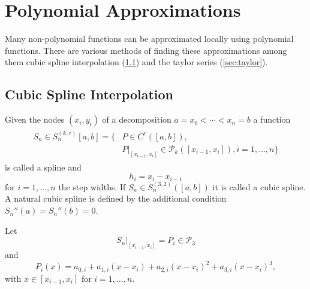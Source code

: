 \documentclass[a4paper, 11pt]{memoir}
\begin{document}
    \section{Polynomial Approximations}
    \label{sec:poly_approx}
    Many non-polynomial functions can be approximated locally using polynomial functions. There are various methods of
    finding these approximations among them cubic spline interpolation (\ref{sec:cubic_spline}) and the taylor series
    (\ref{sec:taylor}).

    \subsection{Cubic Spline Interpolation}
    \label{sec:cubic_spline}
    Given the nodes $(x_i, y_i)$ of a decomposition $a = x_0 < \cdots < x_n = b$ a function
    \begin{align}
        \begin{aligned}
            S_n \in S_n^{(k, r)}[a, b] = \{ &P \in C^r([a, b]),\\&P|_{[x_{i - 1}, x_i]} \in \mathcal{P}_k([x_{i - 1}, x_i]), i=1,\dots,n \}
        \end{aligned}
    \end{align}
    is called a spline and
    \begin{equation}
        h_i = x_i - x_{i-1}
    \end{equation}
    for $i=1,\dots,n$ the step widths. If $S_n \in S_n^{(3, 2)}([a, b])$ it is called a cubic spline. A natural cubic spline is defined by
    the additional condition $S_n''(a) = S_n''(b) = 0$.

    Let
    \begin{equation}
        S_n|_{[x_{i-1}, x_i]} = P_i \in \mathcal{P}_3
    \end{equation}
    and
    \begin{equation}
        P_i(x) = a_{0,i} + a_{1,i}(x - x_i) + a_{2,i}(x - x_i)^2 + a_{3,i}(x - x_i)^3,
    \end{equation}
    with $x\in[x_{i-1}, x_i]$ for $i=1,\dots,n$.
\end{document}

